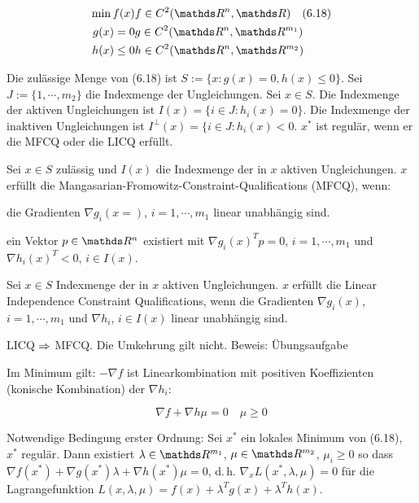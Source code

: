 \begin{align*}
\min f(x) & f \in C^2(\R^n, \R) \quad (6.18)\\
g(x)=0 & g \in C^2(\R^n, \R^{m_1}) \\
h(x) \leq 0 & h \in C^2(\R^n, \R^{m_2}) \\
\end{align*}

Die zulässige Menge von (6.18) ist $S := \{x: g(x)=0, h(x) \leq 0 \}$. Sei $J := \{1,\cdots,m_2\}$ die Indexmenge der Ungleichungen. Sei $x \in S$. Die Indexmenge der aktiven Ungleichungen ist $I(x) = \{i\in J : h_i(x) = 0\}$. Die Indexmenge der inaktiven Ungleichungen ist $I^\perp (x) = \{ i \in J: h_i(x) < 0$. $x^*$ ist regulär, wenn er die MFCQ oder die LICQ erfüllt.


Sei $x \in S$ zulässig und $I(x)$ die Indexmenge der in $x$ aktiven Ungleichungen. $x$ erfüllt die Mangasarian-Fromowitz-Constraint-Qualifications (MFCQ), wenn:

\bitm
\item die Gradienten $\nabla g_i(x=)$, $i=1,\cdots, m_1$ linear unabhängig sind.
\item ein Vektor $p \in \R^n$ existiert mit $\nabla g_i(x)^T p = 0$, $i=1,\cdots,m_1$ und $\nabla h_i(x)^T < 0$, $i \in I(x)$.
\eitm


Sei $x\in S$ Indexmenge der in $x$ aktiven Ungleichungen. $x$ erfüllt die Linear Independence Constraint Qualifications, wenn die Gradienten $\nabla g_i(x)$, $i=1,\cdots,m_1$ und $\nabla h_i$, $i \in I(x)$ linear unabhängig sind.


LICQ $\Rightarrow$ MFCQ. Die Umkehrung gilt nicht. Beweis: Übungsaufgabe

Im Minimum gilt: $-\nabla f$ ist Linearkombination mit positiven Koeffizienten (konische Kombination) der $\nabla h_i$:

\[ \nabla f + \nabla h \mu = 0 \quad \mu \geq 0 \]


\bitm
\item Notwendige Bedingung erster Ordnung: Sei $x^*$ ein lokales Minimum von (6.18), $x^*$ regulär. Dann existiert $\lambda \in \R^{m_1}$, $\mu \in \R^{m_2}$, $\mu_i \geq 0$ so dass $\nabla f(x^*) + \nabla g(x^*) \lambda + \nabla h(x^*) \mu = 0$, d.\,h. $\nabla_x L(x^*, \lambda, \mu) = 0$ für die Lagrangefunktion $L(x,\lambda, \mu) = f(x) + \lambda^T g(x) + \lambda^T h(x)$.

